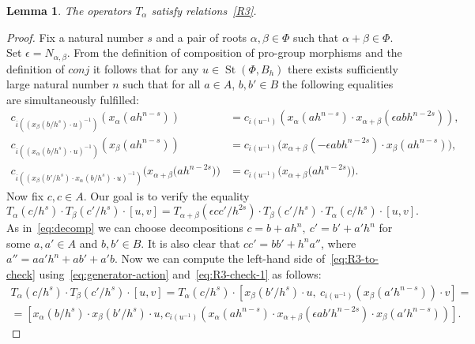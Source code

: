 \documentclass[oneside, 11pt]{amsart} \pdfoutput=1
\newcommand{\St}{\mathop{\mathrm{St}}\nolimits}
\numberwithin{equation}{section}
\newtheorem{lemma}{Lemma} \numberwithin{lemma}{section}
\theoremstyle{definition}
\begin{document}
\begin{lemma} \label{lem:R3-check} The operators $T_\alpha$ satisfy relations~\eqref{R3}. \end{lemma}
\begin{proof}
 Fix a natural number $s$ and a pair of roots $\alpha, \beta \in \Phi$ such that $\alpha+\beta\in\Phi$. Set $\epsilon = N_{\alpha, \beta}$. From the definition of composition of pro-group morphisms and the definition of $conj$ it follows that for any $u \in \St(\Phi, B_h)$ there exists sufficiently large natural number $n$ such that for all $a \in A$, $b, b'\in B$ the following equalities are simultaneously fulfilled:
 \begin{align}
 c_{ \overline{\iota}((x_\beta(b/h^s) \cdot u)^{-1})}(x_\alpha(ah^{n-s})) &= c_{\overline{\iota}(u^{-1})}\left(x_\alpha(ah^{n-s}) \cdot x_{\alpha+\beta}(\epsilon ab h^{n-2s})\right), \label{eq:R3-check-1}\\
 c_{ \overline{\iota}((x_\alpha(b/h^s) \cdot u)^{-1})}(x_\beta(ah^{n - s})) &= c_{\overline{\iota}(u^{-1})}\bigl(x_{\alpha + \beta}(-\epsilon abh^{n - 2s})\cdot x_\beta(ah^{n - s})\bigr), \label{eq:R3-check-2} \\
 c_{ \overline{\iota}((x_\beta(b'/h^s) \cdot x_\alpha(b/h^s) \cdot u)^{-1})}\bigl(x_{\alpha + \beta}\bigl(a h^{n - 2s}\bigr)\bigr) &= c_{\overline{\iota}(u^{-1})}\bigl(x_{\alpha + \beta}\bigl(a h^{n - 2s}\bigr)\bigr). \label{eq:R3-check-3}
 \end{align} 
Now fix $c, c\in A$. Our goal is to verify the equality 
\begin{equation} \label{eq:R3-to-check} T_\alpha(c/h^s) \cdot T_\beta(c'/h^s) \cdot [u, v] = T_{\alpha+\beta}(\epsilon cc' / h^{2s}) \cdot T_\beta(c'/h^s) \cdot T_\alpha(c/h^s) \cdot [u, v].\end{equation}
As in~\eqref{eq:decomp} we can choose decompositions $c = b + ah^n,\ c' = b' + a'h^n$ for some $a, a' \in A$ and $b, b' \in B$. It is also clear that $cc' = bb' + h^{n}a''$, where $a'' = aa'h^n + ab' + a'b$. Now we can compute the left-hand side of~\eqref{eq:R3-to-check} using~\eqref{eq:generator-action} and~\eqref{eq:R3-check-1} as follows:
\begin{multline*}
 T_\alpha(c/h^s) \cdot T_\beta(c'/h^s) \cdot [u, v] = T_\alpha(c/h^s) \cdot [x_\beta(b'/h^s) \cdot u,\ c_{\overline{\iota}(u^{-1})}(x_\beta(a'h^{n-s})) \cdot v] = \\ = [x_\alpha(b/h^s) \cdot x_\beta(b'/h^s) \cdot u, c_{\overline{\iota}(u^{-1})}(x_\alpha(ah^{n-s}) \cdot x_{\alpha+\beta}(\epsilon ab'h^{n-2s}) \cdot x_\beta(a'h^{n-s}))]. \end{multline*}

\end{proof}
\end{document}

